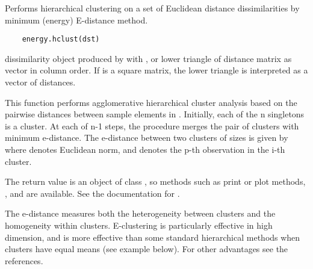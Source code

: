 \begin{Description}\relax
Performs hierarchical clustering on a set of Euclidean distance 
dissimilarities by minimum (energy) E-distance method.
\end{Description}
\begin{Usage}
\begin{verbatim}
    energy.hclust(dst)
\end{verbatim}
\end{Usage}
\begin{Arguments}
\begin{ldescription}
\item[\code{dst}] dissimilarity object produced by  with
, or lower triangle of distance
matrix as vector in column order. If  is a square
matrix, the lower triangle is interpreted as a vector of
distances.
\end{ldescription}
\end{Arguments}
\begin{Details}\relax
This function performs agglomerative hierarchical cluster analysis
based on the pairwise distances between sample elements in .
Initially, each of the n singletons is a cluster. At each of n-1 steps, the 
procedure merges the pair of clusters with minimum e-distance. 
The e-distance
between two clusters  of sizes  is given by
where
\eqn{\|\cdot\|}{|| ||} denotes Euclidean norm, and  denotes the p-th observation in the i-th cluster.  

The return value is an object of class , so 
methods such as print or plot methods, , and 
are available. See the documentation for .

The e-distance measures both the heterogeneity between clusters and the
homogeneity within clusters. E-clustering is particularly effective in
high dimension, and is more effective than some standard hierarchical
methods when clusters have equal means (see example below).
For other advantages see the references.\end{Details}
